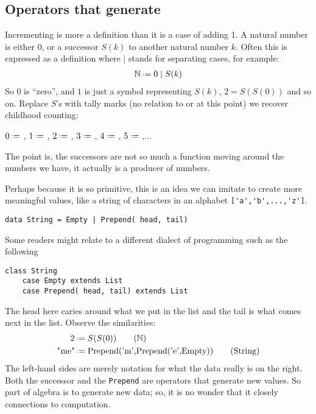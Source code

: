\subsection{Operators that generate}
Incrementing is more a definition than it is a 
 case of adding 1.
A natural number is either $0$, or a successor 
$S(k)$ to 
another natural number $k$.  Often this is expressed as a 
definition where $\mid$ stands for separating cases, 
for example:
\begin{align*}
    \mathbb{N} \defeq 0 \mid S(k)
\end{align*}
So $0$ is ``zero'', and $1$ is just a symbol representing $S(k)$, 
$2=S(S(0))$ and so on.  Replace $S$'s with tally marks (no relation to or at this point)
we recover childhood counting:
\begin{center}
    $0\defeq$ \underline{\hspace{5mm}}, 
    $1\defeq$ \StrokeOne,
    $2\defeq$ \StrokeTwo,
    $3\defeq$ \StrokeThree,
    $4\defeq$ \StrokeFour,
    $5\defeq$ \StrokeFive,...
\end{center}
The point is, the successors are not so much a function 
moving around the numbers we have, it actually is a producer 
of numbers. 

Perhaps because it is so primitive, this is an idea we 
can imitate to create more meaningful values, like a string 
of characters in an alphabet \lstinline{['a','b',...,'z']}.
\begin{lstlisting}[language=Hidris]
data String = Empty | Prepend( head, tail) 
\end{lstlisting}
Some readers might relate to a different dialect of 
programming such as the following
\begin{lstlisting}[language=Sava]
class String
    case Empty extends List
    case Prepend( head, tail) extends List
\end{lstlisting}
The head here caries around what we put in the list and the tail 
is what comes next in the list.  Observe the similarities:
\begin{align}
     2 & \defeq S(S(0)) \tag{$\mathbb{N}$}\\
 \text{\lstinline{"me"}} & \defeq \text{\lstinline{Prepend('m',Prepend('e',Empty))}}
\tag{String}
\end{align}
The left-hand sides are merely notation for what the data really is on the right.
Both the successor and the \lstinline{Prepend} are operators that generate 
new values.  So part of algebra is to generate new data; so, it is no wonder 
that it closely connections to computation.

